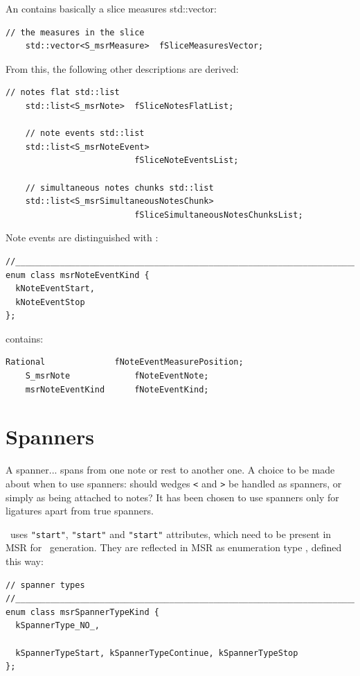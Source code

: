 An  contains basically a slice measures std::vector:
\begin{lstlisting}[language=CPlusPlus]
    // the measures in the slice
    std::vector<S_msrMeasure>  fSliceMeasuresVector;
\end{lstlisting}

From this, the following other descriptions are derived:
\begin{lstlisting}[language=CPlusPlus]
    // notes flat std::list
    std::list<S_msrNote>  fSliceNotesFlatList;

    // note events std::list
    std::list<S_msrNoteEvent>
                          fSliceNoteEventsList;

    // simultaneous notes chunks std::list
    std::list<S_msrSimultaneousNotesChunk>
                          fSliceSimultaneousNotesChunksList;
\end{lstlisting}

Note events are distinguished with :
\begin{lstlisting}[language=CPlusPlus]
//________________________________________________________________________
enum class msrNoteEventKind {
  kNoteEventStart,
  kNoteEventStop
};
\end{lstlisting}

 contains:
\begin{lstlisting}[language=CPlusPlus]
    Rational              fNoteEventMeasurePosition;
    S_msrNote             fNoteEventNote;
    msrNoteEventKind      fNoteEventKind;

\end{lstlisting}



\section{Spanners}\label{Spanners}

A spanner... spans from one note or rest to another one. A choice to be made about when to use spanners: should
wedges {\tt <} and {\tt >} be handled as spanners, or simply as being attached to notes? It has been chosen to use spanners only for ligatures apart from true spanners.

\mxml\ uses {\tt "start"}, {\tt "start"} and {\tt "start"} attributes, which need to be present in MSR for \mxml\ generation. They are reflected in MSR as enumeration type , defined this way:
\begin{lstlisting}[language=CPlusPlus]
// spanner types
//______________________________________________________________________________
enum class msrSpannerTypeKind {
  kSpannerType_NO_,

  kSpannerTypeStart, kSpannerTypeContinue, kSpannerTypeStop
};
\end{lstlisting}


